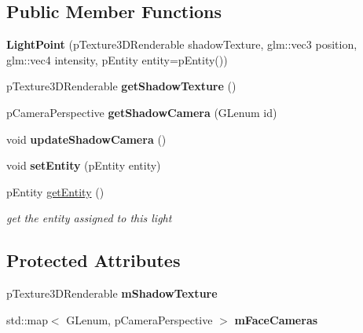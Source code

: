 \subsection*{Public Member Functions}
\begin{DoxyCompactItemize}
\item 
\hypertarget{classfillwave_1_1space_1_1LightPoint_a2d5b4c14dc3273997cff3059793f7be0}{}{\bfseries Light\+Point} (p\+Texture3\+D\+Renderable shadow\+Texture, glm\+::vec3 position, glm\+::vec4 intensity, p\+Entity entity=p\+Entity())\label{classfillwave_1_1space_1_1LightPoint_a2d5b4c14dc3273997cff3059793f7be0}

\item 
\hypertarget{classfillwave_1_1space_1_1LightPoint_af37bbbac16a98634bb63f1ec9fb440a2}{}p\+Texture3\+D\+Renderable {\bfseries get\+Shadow\+Texture} ()\label{classfillwave_1_1space_1_1LightPoint_af37bbbac16a98634bb63f1ec9fb440a2}

\item 
\hypertarget{classfillwave_1_1space_1_1LightPoint_a9bb50dbf67e231841556ab11784633a2}{}p\+Camera\+Perspective {\bfseries get\+Shadow\+Camera} (G\+Lenum id)\label{classfillwave_1_1space_1_1LightPoint_a9bb50dbf67e231841556ab11784633a2}

\item 
\hypertarget{classfillwave_1_1space_1_1LightPoint_a5aace7f3a717ffff4e9ba352284cd41c}{}void {\bfseries update\+Shadow\+Camera} ()\label{classfillwave_1_1space_1_1LightPoint_a5aace7f3a717ffff4e9ba352284cd41c}

\item 
\hypertarget{classfillwave_1_1space_1_1LightPoint_ac879a45ce8e5454fcaba8585c4dc1fd1}{}void {\bfseries set\+Entity} (p\+Entity entity)\label{classfillwave_1_1space_1_1LightPoint_ac879a45ce8e5454fcaba8585c4dc1fd1}

\item 
p\+Entity \hyperlink{classfillwave_1_1space_1_1LightPoint_a48f9307245205c1d0cf0a4a7d0fab61e}{get\+Entity} ()
\begin{DoxyCompactList}\small\item\em get the entity assigned to this light \end{DoxyCompactList}\end{DoxyCompactItemize}
\subsection*{Protected Attributes}
\begin{DoxyCompactItemize}
\item 
\hypertarget{classfillwave_1_1space_1_1LightPoint_ac4b938e996e43a388cf7a7dbeb19b5dc}{}p\+Texture3\+D\+Renderable {\bfseries m\+Shadow\+Texture}\label{classfillwave_1_1space_1_1LightPoint_ac4b938e996e43a388cf7a7dbeb19b5dc}

\item 
\hypertarget{classfillwave_1_1space_1_1LightPoint_afe4a22150041b65abf9e140cbe005993}{}std\+::map$<$ G\+Lenum, p\+Camera\+Perspective $>$ {\bfseries m\+Face\+Cameras}\label{classfillwave_1_1space_1_1LightPoint_afe4a22150041b65abf9e140cbe005993}

\end{DoxyCompactItemize}


